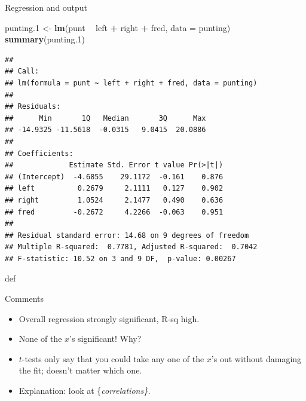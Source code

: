 \documentclass[ignorenonframetext,]{beamer}
\newenvironment{Shaded}{\begin{snugshade}}{\end{snugshade}}
\newcommand{\DataTypeTok}[1]{\textcolor[rgb]{0.13,0.29,0.53}{#1}}
\newcommand{\FloatTok}[1]{\textcolor[rgb]{0.00,0.00,0.81}{#1}}
\newcommand{\KeywordTok}[1]{\textcolor[rgb]{0.13,0.29,0.53}{\textbf{#1}}}
\newcommand{\NormalTok}[1]{#1}
\newcommand{\OperatorTok}[1]{\textcolor[rgb]{0.81,0.36,0.00}{\textbf{#1}}}
\newcommand{\StringTok}[1]{\textcolor[rgb]{0.31,0.60,0.02}{#1}}
\begin{document}
\begin{frame}[fragile]{Regression and output}
\protect\hypertarget{regression-and-output}{}

\begin{Shaded}
\begin{Highlighting}[]
\NormalTok{punting}\FloatTok{.1}\NormalTok{ <-}\StringTok{ }\KeywordTok{lm}\NormalTok{(punt }\OperatorTok{~}\StringTok{ }\NormalTok{left }\OperatorTok{+}\StringTok{ }\NormalTok{right }\OperatorTok{+}\StringTok{ }\NormalTok{fred, }\DataTypeTok{data =}\NormalTok{ punting)}
\KeywordTok{summary}\NormalTok{(punting}\FloatTok{.1}\NormalTok{)}
\end{Highlighting}
\end{Shaded}

\begin{verbatim}
## 
## Call:
## lm(formula = punt ~ left + right + fred, data = punting)
## 
## Residuals:
##      Min       1Q   Median       3Q      Max 
## -14.9325 -11.5618  -0.0315   9.0415  20.0886 
## 
## Coefficients:
##             Estimate Std. Error t value Pr(>|t|)
## (Intercept)  -4.6855    29.1172  -0.161    0.876
## left          0.2679     2.1111   0.127    0.902
## right         1.0524     2.1477   0.490    0.636
## fred         -0.2672     4.2266  -0.063    0.951
## 
## Residual standard error: 14.68 on 9 degrees of freedom
## Multiple R-squared:  0.7781, Adjusted R-squared:  0.7042 
## F-statistic: 10.52 on 3 and 9 DF,  p-value: 0.00267
\end{verbatim}

def

\end{frame}

\begin{frame}{Comments}
\protect\hypertarget{comments-7}{}

\begin{itemize}
\item
  Overall regression strongly significant, R-sq high.
\item
  None of the \(x\)'s significant! Why?
\item
  \(t\)-tests only say that you could take any one of the \(x\)'s out
  without damaging the fit; doesn't matter which one.
\item
  Explanation: look at \{\em correlations\}.
\end{itemize}

\end{frame}
\end{document}
